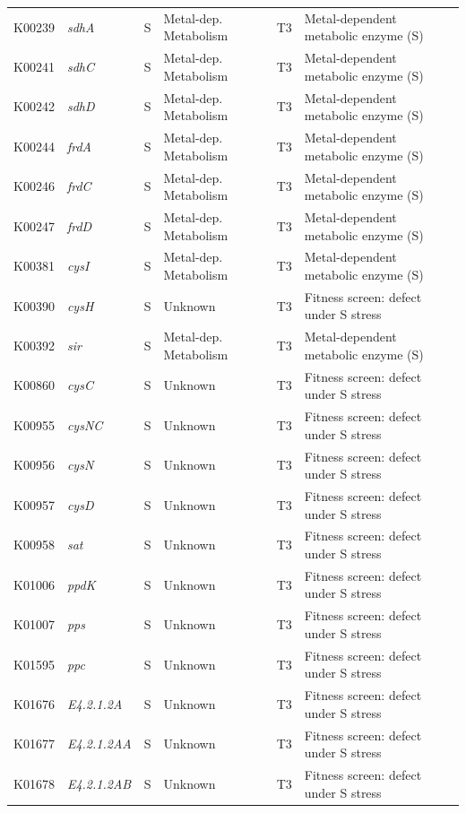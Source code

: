 \documentclass[11pt]{article}
\begin{document}
\begin{longtable}{lllllp{4.8cm}}
K00239 & \textit{sdhA} & S & Metal-dep. Metabolism & T3 & Metal-dependent metabolic enzyme (S) \\
K00241 & \textit{sdhC} & S & Metal-dep. Metabolism & T3 & Metal-dependent metabolic enzyme (S) \\
K00242 & \textit{sdhD} & S & Metal-dep. Metabolism & T3 & Metal-dependent metabolic enzyme (S) \\
K00244 & \textit{frdA} & S & Metal-dep. Metabolism & T3 & Metal-dependent metabolic enzyme (S) \\
K00246 & \textit{frdC} & S & Metal-dep. Metabolism & T3 & Metal-dependent metabolic enzyme (S) \\
K00247 & \textit{frdD} & S & Metal-dep. Metabolism & T3 & Metal-dependent metabolic enzyme (S) \\
K00381 & \textit{cysI} & S & Metal-dep. Metabolism & T3 & Metal-dependent metabolic enzyme (S) \\
K00390 & \textit{cysH} & S & Unknown & T3 & Fitness screen: defect under S stress \\
K00392 & \textit{sir} & S & Metal-dep. Metabolism & T3 & Metal-dependent metabolic enzyme (S) \\
K00860 & \textit{cysC} & S & Unknown & T3 & Fitness screen: defect under S stress \\
K00955 & \textit{cysNC} & S & Unknown & T3 & Fitness screen: defect under S stress \\
K00956 & \textit{cysN} & S & Unknown & T3 & Fitness screen: defect under S stress \\
K00957 & \textit{cysD} & S & Unknown & T3 & Fitness screen: defect under S stress \\
K00958 & \textit{sat} & S & Unknown & T3 & Fitness screen: defect under S stress \\
K01006 & \textit{ppdK} & S & Unknown & T3 & Fitness screen: defect under S stress \\
K01007 & \textit{pps} & S & Unknown & T3 & Fitness screen: defect under S stress \\
K01595 & \textit{ppc} & S & Unknown & T3 & Fitness screen: defect under S stress \\
K01676 & \textit{E4.2.1.2A} & S & Unknown & T3 & Fitness screen: defect under S stress \\
K01677 & \textit{E4.2.1.2AA} & S & Unknown & T3 & Fitness screen: defect under S stress \\
K01678 & \textit{E4.2.1.2AB} & S & Unknown & T3 & Fitness screen: defect under S stress \\

\end{longtable}
\end{document}
